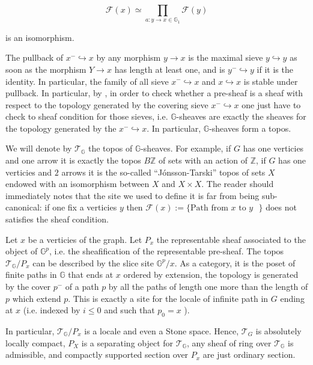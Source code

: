 \documentclass[a4paper]{article}
\newcommand{\G}{\mathbb{G}}
\newcommand{\Tcal}{\mathcal{T}}
\newcommand{\Fcal}{\mathcal{F}}
\begin{document}
{\[ \Fcal(x) \simeq \prod_{a: y \rightarrow x \in \G_1} \Fcal(y) \]

is an isomorphism.



The pullback of $x^{-} \hookrightarrow x$ by any morphism $y \rightarrow x$ is the maximal sieve $y \hookrightarrow y$ as soon as the morphism $Y \rightarrow x$ has length at least one, and is $y^{-} \hookrightarrow y$ if it is the identity. In particular, the family of all sieve $x^{-} \hookrightarrow x$ and $x \hookrightarrow x$ is stable under pullback. In particular, by \cite[Corrolary II.2.3]{SGA4I}, in order to check whether a pre-sheaf is a sheaf with respect to the topology generated by the covering sieve $x^{-} \hookrightarrow x$ one just have to check to sheaf condition for those sieves, i.e. $\G$-sheaves are exactly the sheaves for the topology generated by the $x^{-} \hookrightarrow x$. In particular, $\G$-sheaves form a topos.


\bigskip

We will denote by $\Tcal_{\G}$ the topos of $\G$-sheaves. For example, if $G$ has one verticies and one arrow it is exactly the topos $B\mathbb{Z}$ of sets with an action of $\mathbb{Z}$, if $G$ has one verticies and $2$ arrows it is the so-called ``J\'onsson-Tarski'' topos of sets $X$ endowed with an isomorphism between $X$ and $X \times X$. The reader should immediately notes that the site we used to define it is far from being sub-canonical: if one fix a verticies $y$ then $\Fcal(x):=\{\text{Path from $x$ to $y$ }\}$ does not satisfies the sheaf condition.

\bigskip

Let $x$ be a verticies of the graph. Let $P_x$ the representable sheaf associated to the object of $\G^p$, i.e. the sheafification of the representable pre-sheaf. The topos $\Tcal_{\G}/P_x$ can be described by the slice site  $\G^p/x$. As a category, it is the poset of finite paths in $\G$ that ends at $x$ ordered by extension, the topology is generated by the cover $p^-$ of a path $p$ by all the paths of length one more than the length of $p$ which extend $p$. This is exactly a site for the locale of infinite path in $G$ ending at $x$ (i.e. indexed by $i \leqslant 0$ and such that $p_0=x$ ).

In particular, $\Tcal_{\G}/P_x$ is a locale and even a Stone space. Hence, $\Tcal_{G}$ is absolutely locally compact, $P_X$ is a separating object for $\Tcal_{\G}$, any sheaf of ring over $\Tcal_{\G}$ is admissible, and compactly supported section over $P_x$ are just ordinary section.

}
\end{document}
